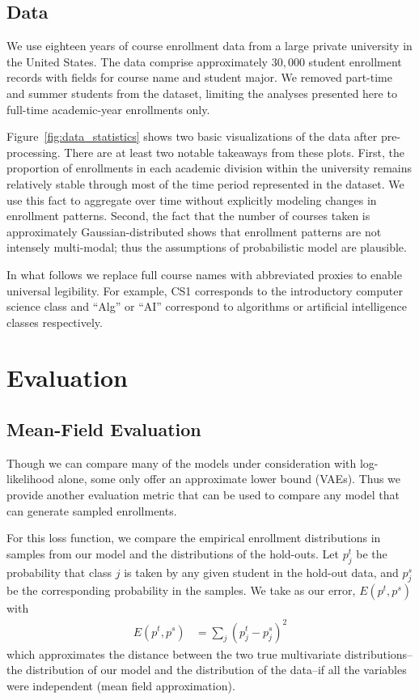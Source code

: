 \documentclass{edm_template}
\begin{document}
\subsection{Data}

We use eighteen years of course enrollment data from a large private university in the United States. The data comprise approximately $30,000$ student enrollment records with fields for course name and student major. We removed part-time and summer students from the dataset, limiting the analyses presented here to full-time academic-year enrollments only. 

Figure~\ref{fig:data_statistics} shows two basic visualizations of the data after pre-processing. There are at least two notable takeaways from these plots. First, the proportion of enrollments in each academic division within the university remains relatively stable through most of the time period represented in the dataset. We use this fact to aggregate over time without explicitly modeling changes in enrollment patterns. Second, the fact that the number of courses taken is approximately Gaussian-distributed shows that enrollment patterns are not intensely multi-modal; thus the assumptions of probabilistic model are plausible.

In what follows we replace full course names with abbreviated proxies to enable universal legibility. For example, CS1 corresponds to the introductory computer science class and ``Alg'' or ``AI'' correspond to algorithms or artificial intelligence classes respectively.

\section{Evaluation}
\label{section:evaluation}

\subsection{Mean-Field Evaluation} 
\label{section:loss_function}

Though we can compare many of the models under consideration with log-likelihood alone, some only offer an approximate lower bound (VAEs). Thus we provide another evaluation metric that can be used to compare any model that can generate sampled enrollments. 

For this loss function, we compare the empirical enrollment distributions in samples from our model and the distributions of the hold-outs. Let $p^t_j$ be the probability that class $j$ is taken by any given student in the hold-out data, and $p^s_j$ be the corresponding probability in the samples. We take as our error, $E(p^t,p^s)$ with 
\begin{align*}
 E(p^t,p^s) 
 &= \sum_j (p^t_j - p^s_j)^2 
\end{align*} 
which approximates the distance between the two true multivariate distributions--the distribution of our model and the distribution of the data--if all the variables were independent (mean field approximation).
\end{document}
